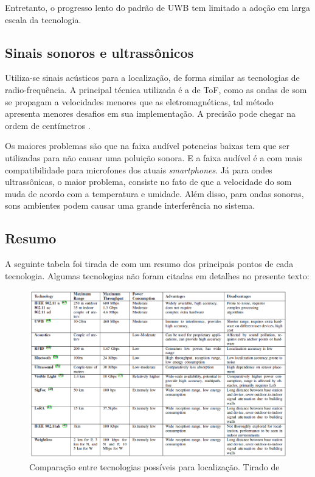 Entretanto, o progresso lento do padrão de UWB tem limitado a adoção em larga escala da tecnologia.


\subsection{Sinais sonoros e ultrassônicos}

Utiliza-se sinais acústicos para a localização, de forma similar as tecnologias de radio-frequência.
A principal técnica utilizada é a de ToF, como as ondas de som se propagam a velocidades menores que as eletromagnéticas, tal método apresenta menores desafios em sua implementação. A precisão pode chegar na ordem de centímetros \cite{art11}.

Os maiores problemas são que na faixa audível potencias baixas tem que ser utilizadas para não causar uma poluição sonora. E a faixa audível é a com mais compatibilidade para microfones dos atuais \textit{smartphones}. Já para ondes ultrassônicas, o maior problema, consiste no fato de que a velocidade do som muda de acordo com a temperatura e umidade. Além disso, para ondas sonoras, sons ambientes podem causar uma grande interferência no sistema.


\subsection{Resumo}
A seguinte tabela foi tirada de \cite{art2} com um resumo dos principais pontos de cada tecnologia. Algumas tecnologias não foram citadas em detalhes no presente texto:

\begin{figure}[H]
	\centering
	\includegraphics[width=1.0\textwidth]{images/technologies_table.png}
	\caption{Comparação entre tecnologias possíveis para localização. Tirado de \cite{art2}}
	\label{fig:technologies_table}
\end{figure}
